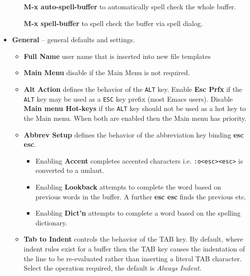 \documentclass[11pt,a4paper,pdftex]{article}
\begin{document}
\begin{itemize}
\begin{itemize}
      \textbf{M-x auto-spell-buffer} to automatically spell check the
      whole buffer.

      \textbf{M-x spell-buffer} to spell check the buffer via spell dialog.

    \end{itemize}

    \item \textbf{General} -- general defaults and settings.

    \begin{itemize}

      \item \textbf{Full Name} user name that is inserted into new file
      templates

      \item \textbf{Main Menu} disable if the Main Menu is not required.

      \item \textbf{Alt Action} defines the behavior of the \texttt{ALT} key.
      Enable \textbf{Esc Prfx} if the \texttt{ALT} key may be used as a
      \texttt{ESC} key prefix (most Emacs users). Disable \textbf{Main menu
      Hot-keys} if the \texttt{ALT} key should not be used as a hot key to the
      Main menu. When both are enabled then the Main menu has priority.

      \item \textbf{Abbrev Setup} defines the behavior of the abbreviation key
      binding \textbf{esc esc}.

      \begin{itemize}

        \item Enabling \textbf{Accent} completes accented characters i.e.
        \texttt{:o<esc><esc>} is converted to a umlaut.

        \item Enabling \textbf{Lookback} attempts to complete the word based
        on previous words in the buffer. A further \textbf{esc esc} finds the
        previous etc.

        \item Enabling \textbf{Dict'n} attempts to complete a word based on
        the spelling dictionary.

      \end{itemize}

      \item \textbf{Tab to Indent} controls the behavior of the TAB key. By
      default, where indent rules exist for a buffer then the TAB key causes
      the indentation of the line to be re-evaluated rather than inserting a
      literal TAB character. Select the operation required, the default is
      \textit{Always Indent}.


\end{itemize}
\end{itemize}
\end{document}
